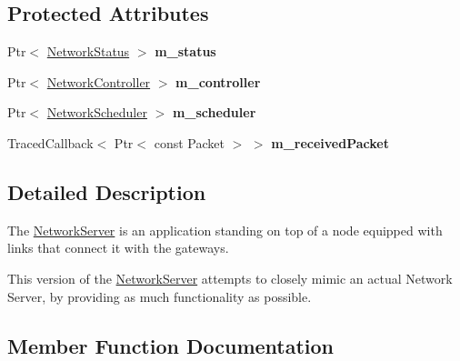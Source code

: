 \subsection*{Protected Attributes}
\begin{DoxyCompactItemize}
\item 
\mbox{\label{classns3_1_1lorawan_1_1NetworkServer_ac09c9f4035d8dab9bd8ffd1669d5db96}} 
Ptr$<$ \hyperlink{classns3_1_1lorawan_1_1NetworkStatus}{Network\+Status} $>$ {\bfseries m\+\_\+status}
\item 
\mbox{\label{classns3_1_1lorawan_1_1NetworkServer_afd6718fe7227371a6bb66a66a00f3267}} 
Ptr$<$ \hyperlink{classns3_1_1lorawan_1_1NetworkController}{Network\+Controller} $>$ {\bfseries m\+\_\+controller}
\item 
\mbox{\label{classns3_1_1lorawan_1_1NetworkServer_abc0198d559dee9d8fb65f6e71d90cc79}} 
Ptr$<$ \hyperlink{classns3_1_1lorawan_1_1NetworkScheduler}{Network\+Scheduler} $>$ {\bfseries m\+\_\+scheduler}
\item 
\mbox{\label{classns3_1_1lorawan_1_1NetworkServer_a893ed17f262e3f3b10cb8be1a1fc9d5d}} 
Traced\+Callback$<$ Ptr$<$ const Packet $>$ $>$ {\bfseries m\+\_\+received\+Packet}
\end{DoxyCompactItemize}


\subsection{Detailed Description}
The \hyperlink{classns3_1_1lorawan_1_1NetworkServer}{Network\+Server} is an application standing on top of a node equipped with links that connect it with the gateways.

This version of the \hyperlink{classns3_1_1lorawan_1_1NetworkServer}{Network\+Server} attempts to closely mimic an actual Network Server, by providing as much functionality as possible. 

\subsection{Member Function Documentation}
\mbox{\label{classns3_1_1lorawan_1_1NetworkServer_ae06877dca7b1a469dd178423bf9f17e5}} 
